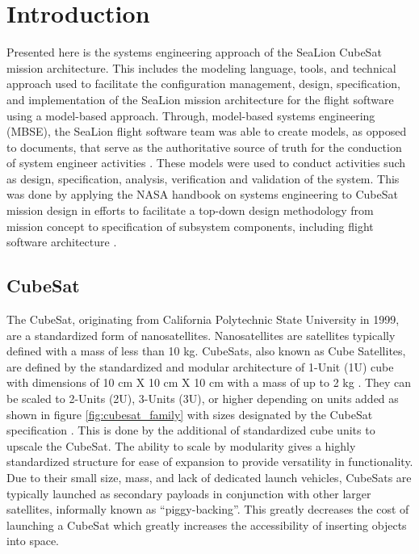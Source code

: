 \documentclass[journal,article,submit,pdftex,moreauthors]{Definitions/mdpi}
\begin{document}

\section{Introduction}

Presented here is the systems engineering approach of the SeaLion CubeSat mission architecture.  This includes the modeling language, tools, and technical approach used to facilitate the configuration management, design, specification, and implementation of the SeaLion mission architecture for the flight software using a model-based approach.  Through, model-based systems engineering (MBSE), the SeaLion flight software team was able to create models, as opposed to documents, that serve as the authoritative source of truth for the conduction of system engineer activities \cite{architecting_spacecraft}.  These models were used to conduct activities such as design, specification, analysis, verification and validation of the system.  This was done by applying the NASA handbook on systems engineering \cite{nasa_handbook} to CubeSat mission design in efforts to facilitate a top-down design methodology from mission concept to specification of subsystem components, including flight software architecture \cite{asundi13_cubes}.

\subsection{CubeSat}
The CubeSat, originating from California Polytechnic State University in 1999, are a standardized form of nanosatellites.  Nanosatellites are satellites typically defined with a mass of less than 10 kg.  CubeSats, also known as Cube Satellites, are defined by the standardized and modular architecture of 1-Unit (1U) cube with dimensions of 10 cm X 10 cm X 10 cm with a mass of up to 2 kg \cite{cds_rev14}.  They can be scaled to 2-Units (2U), 3-Units (3U), or higher depending on units added as shown in figure \ref{fig:cubesat_family} with sizes designated by the CubeSat specification \cite{cds_rev14}.  This is done by the additional of standardized cube units to upscale the CubeSat.  The ability to scale by modularity gives a highly standardized structure for ease of expansion to provide versatility in functionality.  Due to their small size, mass, and lack of dedicated launch vehicles, CubeSats are typically launched as secondary payloads in conjunction with other larger satellites, informally known as “piggy-backing”.  This greatly decreases the cost of launching a CubeSat which greatly increases the accessibility of inserting objects into space.
\end{document}
